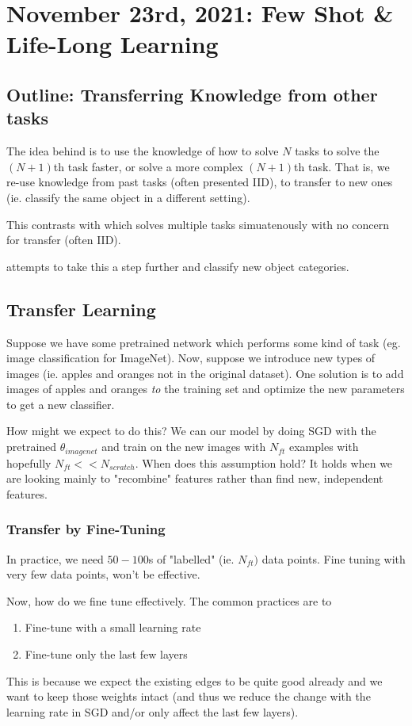 \documentclass[11pt]{scrartcl}
\begin{document}
\newpage

\section{November 23rd, 2021: Few Shot & Life-Long Learning}

\subsection{Outline: Transferring Knowledge from other tasks}
The idea behind  is to use the knowledge of how to solve $N$ tasks to solve the $(N+1)$th task faster, or solve a more complex $(N+1)$th task. That is, we re-use knowledge from past tasks (often presented IID), to transfer to new ones (ie. classify the same object in a different setting).

This contrasts with  which solves multiple tasks simuatenously with no concern for transfer (often IID). 

 attempts to take this a step further and classify new object categories. 

\subsection{Transfer Learning}

Suppose we have some pretrained network which performs some kind of task (eg. image classification for ImageNet). Now, suppose we introduce new types of images (ie. apples and oranges not in the original dataset). One solution is to add images of apples and oranges \textit{to} the training set and optimize the new parameters to get a new classifier. 

How might we expect to do this? We can  our model by doing SGD with the pretrained $\theta_{imagenet}$ and train on the new images with $N_{ft}$ examples with hopefully $N_{ft}<<N_{scratch}$. When does this assumption hold? It holds when we are looking mainly to "recombine" features rather than find new, independent features. 

\subsubsection{Transfer by Fine-Tuning}
In practice, we need $50-100$s of "labelled" (ie. $N_{ft})$ data points. Fine tuning with very few data points, won't be effective. 

Now, how do we fine tune effectively. The common practices are to 
\begin{enumerate}
    \item Fine-tune with a small learning rate
    \item Fine-tune only the last few layers
\end{enumerate}
This is because we expect the existing edges to be quite good already and we want to keep those weights intact (and thus we reduce the change with the learning rate in SGD and/or only affect the last few layers).
\end{document}
